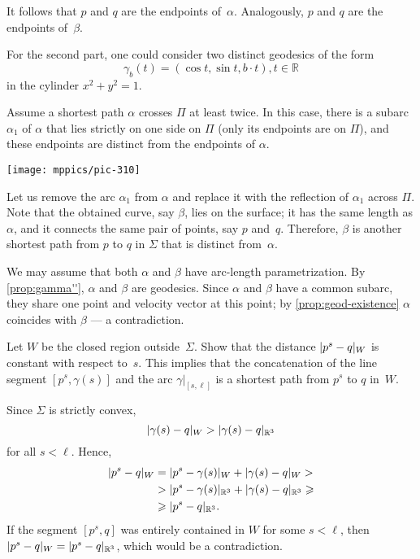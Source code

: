 \begin{multicols}{2}
It follows that $p$ and $q$ are the endpoints of~$\alpha$.
Analogously, $p$ and $q$ are the endpoints of~$\beta$.

For the second part, one could consider two distinct geodesics of the form 
\[ \gamma_b(t) = ( \cos t , \sin t , b\cdot t ) , t \in \mathbb{R} \]
in the cylinder $x^2 + y^2 =1$.

Assume a shortest path $\alpha$ crosses $\Pi$ at least twice.
In this case, there is a subarc $\alpha_1$ of $\alpha$ that lies strictly on one side on $\Pi$ (only its endpoints are on $\Pi$), and these endpoints are distinct from the endpoints of $\alpha$.
 
\begin{Figure}
\vskip-1mm
\centering
\texttt{[image: mppics/pic-310]}
\vskip-1mm
\end{Figure}

Let us remove the arc $\alpha_1$ from $\alpha$ and replace it with the reflection of $\alpha_1$ across $\Pi$.
Note that the obtained curve, say $\beta$, lies on the surface;
it has the same length as $\alpha$, and it connects the same pair of points, say $p$ and~$q$.
Therefore, $\beta$ is another shortest path from $p$ to $q$ in $\Sigma$ that is distinct from~$\alpha$.

We may assume that both $\alpha$ and $\beta$ have arc-length parametrization.
By \ref{prop:gamma''}, $\alpha$ and $\beta$ are geodesics.
Since $\alpha$ and $\beta$ have a common subarc, they share one point and velocity vector at this point;
by \ref{prop:geod-existence} $\alpha$ coincides with $\beta$ --- a contradiction.


Let $W$ be the closed region outside~$\Sigma$.
Show that the distance $\dist{p^s}{q}W$ is constant with respect to~$s$.
This implies that the concatenation of the line segment $[p^s,\gamma(s)]$ and the arc $\gamma|_{[s,\ell]}$ is a shortest path from $p^s$ to $q$ in~$W$.

Since $\Sigma$ is strictly convex, 
\[ \dist{\gamma (s)}{q}W > \dist{\gamma(s)}{q}{\mathbb{R}^3} \]
for all $s < \ell$.
Hence,
\begin{align*}
\dist{p^s}{q}W&=\dist{p^s}{\gamma(s)}W+\dist{\gamma (s)}{q}W 
> 
\\
&>\dist{p^s}{\gamma(s)}{\mathbb{R}^3} + \dist{ \gamma (s)}{q}{\mathbb{R}^3} 
\ge
\\
&\ge\dist{p^s}{q}{\mathbb{R}^3}. 
\end{align*}
If the segment $[p^s,q]$ was entirely contained in $W$ for some $s<\ell$, then $\dist{p^s}{q}W = \dist{p^s}{q}{\mathbb{R}^3} $, which would be a contradiction.


\end{multicols}
